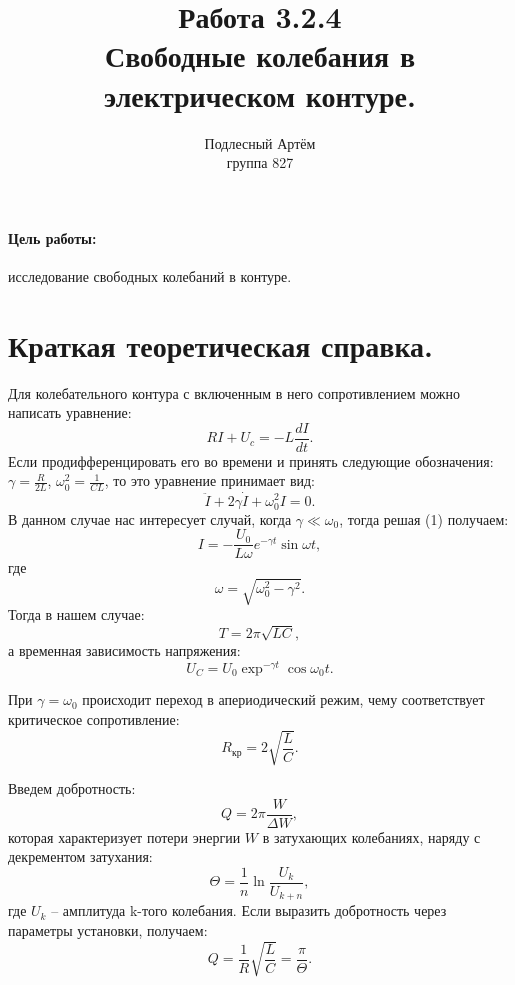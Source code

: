 \documentclass[a4paper, 14pt]{extarticle}%
\author{Подлесный Артём \\ группа 827}
\title{Работа 3.2.4 \\ Свободные колебания в электрическом контуре. }
\begin{document}
\maketitle

\paragraph*{Цель работы:}исследование свободных колебаний в контуре.

\section*{Краткая теоретическая справка.}

Для колебательного контура с включенным в него сопротивлением можно написать уравнение:
\[RI+U_c=-L\frac{dI}{dt}.\]
Если продифференцировать его во времени и принять следующие обозначения: $\gamma = \frac{R}{2L}$, $\omega^2_0=\frac{1}{CL}$, то это уравнение принимает вид:
\begin{equation}
\ddot{I}+2\gamma\dot{I}+\omega^2_0I=0.
\end{equation}
В данном случае нас интересует случай, когда $\gamma\ll\omega_0$, тогда решая (1) получаем:
\begin{equation}
I= - \frac{U_0}{L\omega}e^{-\gamma t}\sin\omega t,
\end{equation}
где 
\[\omega = \sqrt{\omega^2_0 - \gamma^2}.\]
Тогда в нашем случае:
\begin{equation}
T = 2\pi\sqrt{LC},
\end{equation}
а временная зависимость напряжения:
\[U_C = U_0\exp^{-\gamma t}\cos\omega_0t.\]

При $\gamma = \omega_0$ происходит переход в апериодический режим, чему соответствует критическое сопротивление:
\begin{equation}
R_{\text{кр}} = 2\sqrt{\frac{L}{C}}.
\end{equation}

Введем добротность:
\[Q = 2\pi\frac{W}{\Delta W},\]
которая характеризует потери энергии $W$ в затухающих колебаниях, наряду с декрементом затухания:
\begin{equation}
\Theta = \frac{1}{n} \ln\dfrac{U_k}{U_{k+n}},
\end{equation}
где $U_k$ -- амплитуда k-того колебания. Если выразить добротность через параметры установки, получаем:
\begin{equation}
Q=\frac{1}{R}\sqrt{\frac{L}{C}} = \frac{\pi}{\Theta}.
\end{equation}
\end{document}
